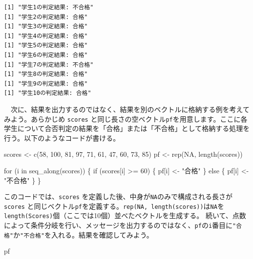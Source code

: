 \documentclass[
  a4paper,
  pandoc,
  ja=standard,
  jafont=haranoaji]{bxjsbook}
\newenvironment{Shaded}{\begin{snugshade}}{\end{snugshade}}
\newcommand{\ConstantTok}[1]{\textcolor[rgb]{0.56,0.35,0.01}{#1}}
\newcommand{\ControlFlowTok}[1]{\textcolor[rgb]{0.00,0.48,0.65}{#1}}
\newcommand{\DecValTok}[1]{\textcolor[rgb]{0.68,0.00,0.00}{#1}}
\newcommand{\FunctionTok}[1]{\textcolor[rgb]{0.28,0.35,0.67}{#1}}
\newcommand{\NormalTok}[1]{\textcolor[rgb]{0.00,0.48,0.65}{#1}}
\newcommand{\OtherTok}[1]{\textcolor[rgb]{0.00,0.48,0.65}{#1}}
\newcommand{\SpecialCharTok}[1]{\textcolor[rgb]{0.37,0.37,0.37}{#1}}
\newcommand{\StringTok}[1]{\textcolor[rgb]{0.13,0.47,0.30}{#1}}
\begin{document}
\begin{verbatim}
[1] "学生1の判定結果: 不合格"
[1] "学生2の判定結果: 合格"
[1] "学生3の判定結果: 合格"
[1] "学生4の判定結果: 合格"
[1] "学生5の判定結果: 合格"
[1] "学生6の判定結果: 合格"
[1] "学生7の判定結果: 不合格"
[1] "学生8の判定結果: 合格"
[1] "学生9の判定結果: 合格"
[1] "学生10の判定結果: 合格"
\end{verbatim}

　次に、結果を出力するのではなく、結果を別のベクトルに格納する例を考えてみよう。あらかじめ
\texttt{scores}
と同じ長さの空ベクトル\texttt{pf}を用意します。ここに各学生について合否判定の結果を「合格」または「不合格」として格納する処理を行う。以下のようなコードが書ける。

\begin{Shaded}
\begin{Highlighting}[numbers=left,,]
\NormalTok{scores }\OtherTok{\textless{}{-}} \FunctionTok{c}\NormalTok{(}\DecValTok{58}\NormalTok{, }\DecValTok{100}\NormalTok{, }\DecValTok{81}\NormalTok{, }\DecValTok{97}\NormalTok{, }\DecValTok{71}\NormalTok{, }\DecValTok{61}\NormalTok{, }\DecValTok{47}\NormalTok{, }\DecValTok{60}\NormalTok{, }\DecValTok{73}\NormalTok{, }\DecValTok{85}\NormalTok{)}
\NormalTok{pf     }\OtherTok{\textless{}{-}} \FunctionTok{rep}\NormalTok{(}\ConstantTok{NA}\NormalTok{, }\FunctionTok{length}\NormalTok{(scores))}

\ControlFlowTok{for}\NormalTok{ (i }\ControlFlowTok{in} \FunctionTok{seq\_along}\NormalTok{(scores)) \{}
  \ControlFlowTok{if}\NormalTok{ (scores[i] }\SpecialCharTok{\textgreater{}=} \DecValTok{60}\NormalTok{) \{}
\NormalTok{    pf[i] }\OtherTok{\textless{}{-}} \StringTok{"合格"}
\NormalTok{  \} }\ControlFlowTok{else}\NormalTok{ \{}
\NormalTok{    pf[i] }\OtherTok{\textless{}{-}} \StringTok{"不合格"}
\NormalTok{  \}}
\NormalTok{\}}
\end{Highlighting}
\end{Shaded}

このコードでは、\texttt{scores}
を定義した後、中身が\texttt{NA}のみで構成される長さが\texttt{scores}
と同じベクトル\texttt{pf}を定義する。\texttt{rep(NA,\ length(scores))}は\texttt{NA}を\texttt{length(Scores)}個（ここでは10個）並べたベクトルを生成する。
続いて、点数によって条件分岐を行い、メッセージを出力するのではなく、\texttt{pf}の\texttt{i}番目に\texttt{"合格"}か\texttt{"不合格"}を入れる。結果を確認してみよう。

\begin{Shaded}
\begin{Highlighting}[numbers=left,,]
\NormalTok{pf}
\end{Highlighting}
\end{Shaded}
\end{document}
